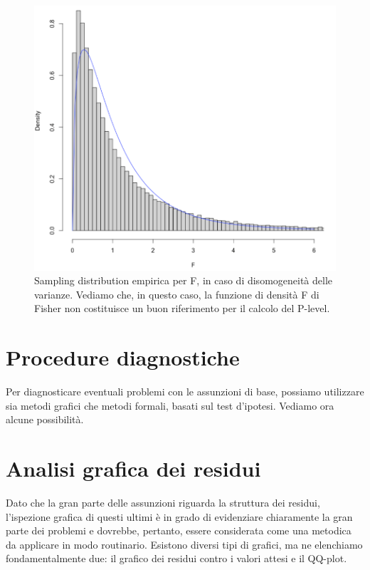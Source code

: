 \documentclass[a4paper,12pt,oneside]{book}
\begin{document}
\begin{figure}

{\centering \includegraphics[width=0.85\linewidth]{_images/SamplingDistribF_false} 

}

\caption{Sampling distribution empirica per F, in caso di disomogeneità delle varianze. Vediamo che, in questo caso, la funzione di densità F di Fisher non costituisce un buon riferimento per il calcolo del P-level.}\label{fig:figName101a}
\end{figure}

\hypertarget{procedure-diagnostiche}{%
\section{Procedure diagnostiche}\label{procedure-diagnostiche}}

Per diagnosticare eventuali problemi con le assunzioni di base, possiamo utilizzare sia metodi grafici che metodi formali, basati sul test d'ipotesi. Vediamo ora alcune possibilità.

\hypertarget{analisi-grafica-dei-residui}{%
\section{Analisi grafica dei residui}\label{analisi-grafica-dei-residui}}

Dato che la gran parte delle assunzioni riguarda la struttura dei residui, l'ispezione grafica di questi ultimi è in grado di evidenziare chiaramente la gran parte dei problemi e dovrebbe, pertanto, essere considerata come una metodica da applicare in modo routinario. Esistono diversi tipi di grafici, ma ne elenchiamo fondamentalmente due: il grafico dei residui contro i valori attesi e il QQ-plot.
\end{document}
